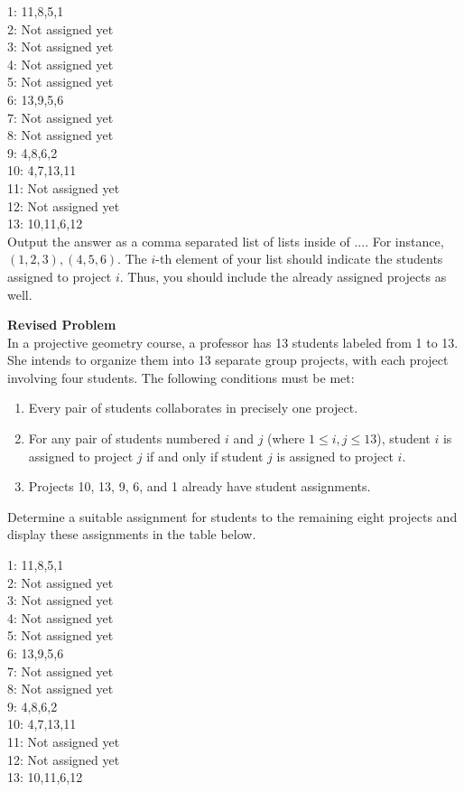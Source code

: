 1: 11,8,5,1 \\
2: Not assigned yet \\
3: Not assigned yet \\
4: Not assigned yet \\
5: Not assigned yet \\
6: 13,9,5,6 \\
7: Not assigned yet \\
8: Not assigned yet \\
9: 4,8,6,2 \\
10: 4,7,13,11 \\
11: Not assigned yet \\
12: Not assigned yet \\
13: 10,11,6,12 \\

Output the answer as a comma separated list of lists inside of $\boxed{...}$. For instance, $\boxed{(1,2,3),(4,5,6)}$. The $i$-th element of your list should indicate the students assigned to project $i$. Thus, you should include the already assigned projects as well.

\textbf{Revised Problem}\\
In a projective geometry course, a professor has 13 students labeled from 1 to 13. She intends to organize them into 13 separate group projects, with each project involving four students. The following conditions must be met:

\begin{enumerate}
    \item Every pair of students collaborates in precisely one project.
    \item For any pair of students numbered $i$ and $j$ (where $1 \leq i, j \leq 13$), student $i$ is assigned to project $j$ if and only if student $j$ is assigned to project $i$.
    \item Projects 10, 13, 9, 6, and 1 already have student assignments.
\end{enumerate}

Determine a suitable assignment for students to the remaining eight projects and display these assignments in the table below.

1: 11,8,5,1 \\
2: Not assigned yet \\
3: Not assigned yet \\
4: Not assigned yet \\
5: Not assigned yet \\
6: 13,9,5,6 \\
7: Not assigned yet \\
8: Not assigned yet \\
9: 4,8,6,2 \\
10: 4,7,13,11 \\
11: Not assigned yet \\
12: Not assigned yet \\
13: 10,11,6,12 \\

